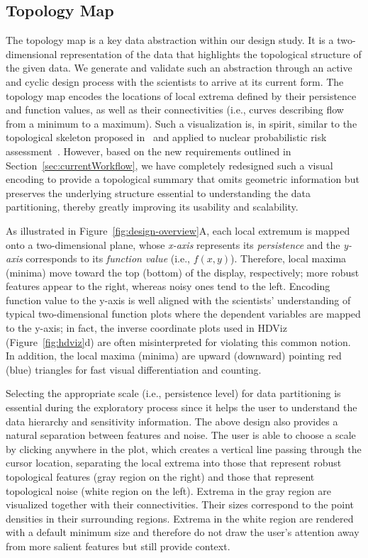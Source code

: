 \subsection{Topology Map}
\label{sec:topologyMap}
The topology map is a key data abstraction within our design study.
%
It is a two-dimensional representation of the data that highlights the topological structure of the given data.
%
We generate and validate such an abstraction through an active and cyclic design process with the scientists to arrive at its current form.
%
The topology map encodes the locations of local extrema defined by their persistence and function values, as well as their connectivities (i.e., curves describing flow from a minimum to a maximum).
%
Such a visualization is, in spirit, similar to the topological skeleton proposed in~\cite{GerberBremerPascucci2010} and applied to nuclear probabilistic risk assessment~\cite{MaljovecWangMandelli2013a,MaljovecWangPascucci2013}.
%
However, based on the new requirements outlined in Section~\ref{sec:currentWorkflow}, we have completely redesigned such a visual encoding to provide a topological summary that omits geometric information but  preserves the underlying structure essential to understanding the data partitioning, thereby greatly improving its usability and scalability.

As illustrated in Figure~\ref{fig:design-overview}A, each local extremum is mapped onto a two-dimensional plane, whose \emph{x-axis} represents its \emph{persistence} and the \emph{y-axis} corresponds to its \emph{function value} (i.e., $f(x,y)$).
%
Therefore, local maxima (minima) move toward the top (bottom) of the display, respectively; more robust features appear to the right, whereas noisy ones tend to the left.
%
Encoding function value to the y-axis is well aligned with the scientists' understanding of typical two-dimensional function plots where the dependent variables are mapped to the y-axis; in fact, the inverse coordinate plots used in HDViz (Figure~\ref{fig:hdviz}d) are often misinterpreted for violating this common notion.
%
In addition, the local maxima (minima) are upward (downward) pointing red (blue)  triangles for fast visual differentiation and counting.

Selecting the appropriate scale (i.e., persistence level) for data partitioning is essential during the exploratory process since it helps the user to understand the data hierarchy and sensitivity information.
%
The above design also provides a natural separation between features and noise.
%
The user is able to choose a scale by clicking anywhere in the plot, which creates a vertical line passing through the cursor location, separating the local extrema into those that represent robust topological features (gray region on the right) and those that represent topological noise (white region on the left).
%
Extrema in the gray region are visualized together with their connectivities.
%
Their sizes correspond to the point densities in their surrounding regions.
%
Extrema in the white region are rendered with a default minimum size and therefore do not draw the user's attention away from more salient features but still provide context.


